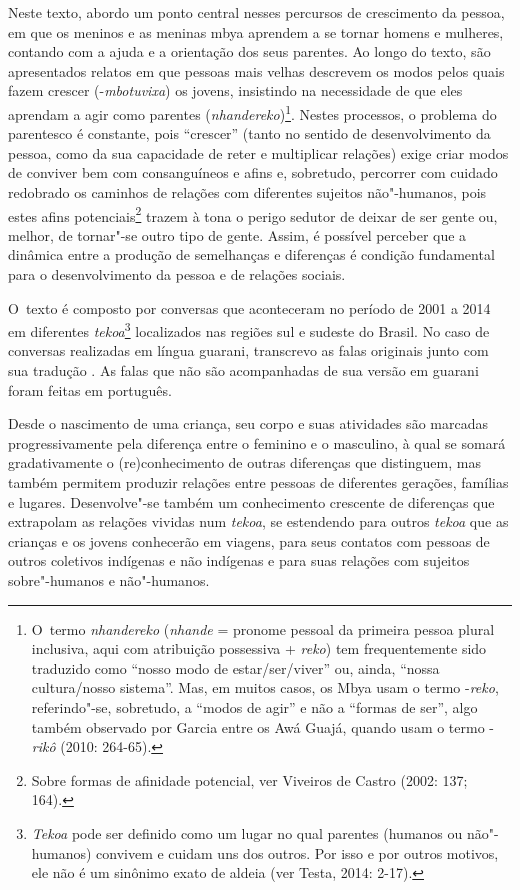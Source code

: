 Neste texto, abordo um ponto central nesses percursos de crescimento da
pessoa, em que os meninos e as meninas mbya aprendem a se tornar homens
e mulheres, contando com a ajuda e a orientação dos seus parentes. Ao
longo do texto, são apresentados relatos em que pessoas mais velhas
descrevem os modos pelos quais fazem crescer (-\emph{mbotuvixa}) os jovens,
insistindo na necessidade de que eles aprendam a agir como parentes
(\emph{nhandereko})\footnote{O~termo \emph{nhandereko} (\emph{nhande} = pronome pessoal da
primeira pessoa plural inclusiva, aqui com atribuição possessiva +
\emph{reko}) tem frequentemente sido traduzido como ``nosso modo de
estar/ser/viver'' ou, ainda, ``nossa cultura/nosso sistema''. Mas, em
muitos casos, os Mbya usam o termo -\emph{reko}, referindo"-se, sobretudo, a
``modos de agir'' e não a ``formas de ser'', algo também observado por Garcia
entre os Awá Guajá, quando usam o termo -\emph{rikô} (2010: 264-65).}. Nestes
processos, o problema do parentesco é constante, pois ``crescer'' (tanto
no sentido de desenvolvimento da pessoa, como da sua capacidade de
reter e multiplicar relações) exige criar modos de conviver bem com
consanguíneos e afins e, sobretudo, percorrer com cuidado redobrado os
caminhos de relações com diferentes sujeitos não"-humanos, pois estes
afins potenciais\footnote{Sobre formas de afinidade potencial, ver
Viveiros de Castro (2002: 137; 164).} trazem à tona o perigo sedutor de
deixar de ser gente ou, melhor, de tornar"-se outro tipo de gente.
Assim, é possível perceber que a dinâmica entre a produção de
semelhanças e diferenças é condição fundamental para o desenvolvimento
da pessoa e de relações sociais. 

O~texto é composto por conversas que aconteceram no período de 2001 a
2014 em diferentes \emph{tekoa}\footnote{\emph{Tekoa} pode ser definido como um lugar
no qual parentes (humanos ou não"-humanos) convivem e cuidam uns dos
outros. Por isso e por outros motivos, ele não é um sinônimo exato de
aldeia (ver Testa, 2014: 2-17).} localizados nas regiões sul e
sudeste do Brasil. No caso de conversas realizadas em língua guarani,
transcrevo as falas originais junto com sua tradução\footnotemark
{}. As falas que não são acompanhadas
de sua versão em guarani foram feitas em português.

Desde o nascimento de uma criança, seu corpo e suas atividades são
marcadas progressivamente pela diferença entre o feminino e o
masculino, à qual se somará gradativamente o (re)conhecimento de outras
diferenças que distinguem, mas também permitem produzir relações entre
pessoas de diferentes gerações, famílias e lugares. Desenvolve"-se
também um conhecimento crescente de diferenças que extrapolam as
relações vividas num \emph{tekoa}, se estendendo para outros \emph{tekoa} que as
crianças e os jovens conhecerão em viagens, para seus contatos com
pessoas de outros coletivos indígenas e não indígenas e para suas
relações com sujeitos sobre"-humanos e não"-humanos. 

